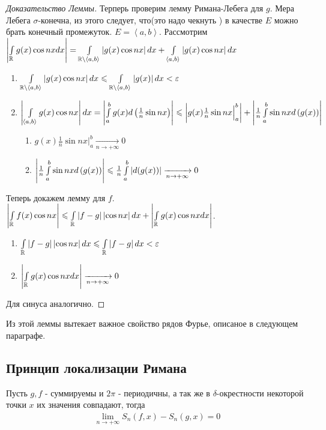 \begin{proof}[Доказательство Леммы]
	Терперь проверим лемму Римана-Лебега для $g$.
	Мера Лебега $\sigma$-конечна, из этого следует, что(это надо чекнуть \todo)
	в качестве $E$ можно брать конечный промежуток.
	$E = \left< a, b\right>$. Рассмотрим $\left|\int\limits_{\mathbb{R}} g(x) \cos nx dx\right| = 
	\int\limits_{\mathbb{R} \setminus \left< a, b \right>} \left|g(x) \cos nx \right|dx +
	\int\limits_{\left<a, b \right>} \left|g(x) \cos nx\right| dx$
	\begin{enumerate}
		\item $\int\limits_{\mathbb{R} \setminus \left< a, b \right>} \left|g(x) \cos nx \right|dx \leqslant 
			\int\limits_{\mathbb{R} \setminus \left< a, b \right>} \left|g(x)\right|dx  < \varepsilon$
		\item $\left|\int\limits_{\left<a, b \right>} g(x) \cos nx\right| dx = 
			\left|\int\limits_{a}^{b} g(x)d\left( \frac{1}{n}\sin nx \right)\right| \leqslant 
			\left|g(x)\frac{1}{n}\sin nx\Big|_{a}^{b}\right| + 
			\left|\frac{1}{n}\int\limits_{a}^{b}\sin nx d\left( g(x)\right)\right|$
			\begin{enumerate}
				\item $g(x)\frac{1}{n}\sin nx\Big|_{a}^{b} \xrightarrow[n \rightarrow +\infty]{} 0$
				\item $\left|\frac{1}{n}\int\limits_{a}^{b}\sin nx d\left( g(x)\right)\right| \leqslant 
					\frac{1}{n} \int\limits_{a}^{b} \left|d(g(x))\right| \xrightarrow[n \rightarrow +\infty]{} 0$ 
			\end{enumerate}
	\end{enumerate}

	Теперь докажем лемму для $f$. $\left|\int\limits_{\mathbb{R}}f(x) \cos nx\right| \leqslant 
	\int\limits_{\mathbb{R}}\left|f - g\right|\left|\cos nx\right| dx + \left|\int\limits_{\mathbb{R}} g(x)\cos nx dx\right|$.
	\begin{enumerate}
		\item $\int\limits_{\mathbb{R}}\left|f - g\right|\left|\cos nx\right| dx \leqslant
			\int\limits_{\mathbb{R}}\left|f - g\right| dx < \varepsilon $
		\item $\left|\int\limits_{\mathbb{R}} g(x)\cos nx dx\right| \xrightarrow[n \rightarrow +\infty]{} 0$
	\end{enumerate}
	Для синуса аналогично.
\end{proof}

Из этой леммы вытекает важное свойство рядов Фурье, описаное в следующем параграфе.

\subsection{Принцип локализации Римана}

\begin{theorem}
	Пусть $g, f$ - суммируемы и $2\pi$ - периодичны, а так же в $\delta$-окрестности некоторой точки $x$
	их значения совпадают, тогда 
	\begin{gather*}
		\lim\limits_{n\rightarrow +\infty} S_n(f, x) - S_n(g, x) = 0
	\end{gather*}
\end{theorem}

